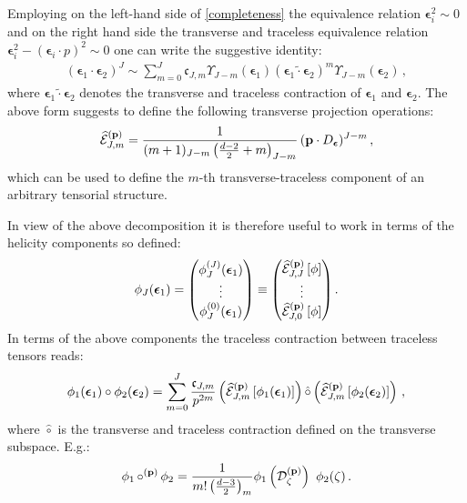 \documentclass[11pt,a4paper]{article}
\begin{document}
Employing on the left-hand side of \eqref{completeness} the equivalence relation $\boldsymbol{\epsilon}_i^2\sim 0$ and on the right hand side the transverse and traceless equivalence relation $\boldsymbol{\epsilon}_i^2-(\boldsymbol{\epsilon}_i\cdot p)^2\sim0$ one can write the suggestive identity:
\begin{align}
    (\boldsymbol{\epsilon}_1\cdot\boldsymbol{\epsilon}_2)^J\sim 
    \sum_{m=0}^J\mathfrak{c}_{J,m} {\Upsilon}_{J-m}(\boldsymbol{\epsilon}_1)(\widetilde{\boldsymbol{\epsilon}_1\cdot\boldsymbol{\epsilon}_2})^m{\Upsilon}_{J-m}(\boldsymbol{\epsilon}_2)\,,
\end{align}
where $\widetilde{\boldsymbol{\epsilon}_1\cdot\boldsymbol{\epsilon}_2}$ denotes the transverse and traceless contraction of $\boldsymbol{\epsilon}_1$ and $\boldsymbol{\epsilon}_2$. The above form suggests to define the following transverse projection operations:
\begin{align}\label{hp}
   \widehat{\mathcal{E}}^{({\bf p})}_{J,m}=\frac{1}{(m+1)_{J-m}\left(\tfrac{d-2}2+m\right)_{J-m}}\,(\bold{p}\cdot D_{\boldsymbol{\epsilon}})^{J-m}\,,
\end{align}
which can be used to define the $m$-th transverse-traceless component of an arbitrary tensorial structure. 

In view of the above decomposition it is therefore useful to work in terms of the helicity components so defined:
\begin{align}
    \phi_J(\boldsymbol{\epsilon}_1)=\begin{pmatrix}
    \phi_J^{(J)}(\boldsymbol{\epsilon}_1)\\
    \vdots\\
    \phi^{(0)}_{J}(\boldsymbol{\epsilon}_1)
    \end{pmatrix}\equiv\begin{pmatrix}
    \widehat{\mathcal{E}}_{J,J}^{({\bf p})}\left[\phi\right]\\
    \vdots\\
    \widehat{\mathcal{E}}_{J,0}^{({\bf p})}\left[\phi\right]
    \end{pmatrix}.
\end{align}
In terms of the above components the traceless contraction between traceless tensors reads:
\begin{align}
    \phi_1(\boldsymbol{\epsilon}_1)\circ\phi_2(\boldsymbol{\epsilon}_2)=\sum_{m=0}^{J}\frac{\mathfrak{c}_{J,m}}{p^{2m}}\left(\widehat{\mathcal{E}}_{J,m}^{({\bf p})}\left[\phi_1(\boldsymbol{\epsilon}_1)\right]\right)\hat{\circ}\left(\widehat{\mathcal{E}}_{J,m}^{({\bf p})}\left[\phi_2(\boldsymbol{\epsilon}_2)\right]\right)\,,
\end{align}
where $\hat{\circ}$ is the transverse and traceless contraction defined on the transverse subspace. E.g.:
\begin{align}
    \phi_1\,{\circ}^{(\bold{p})}\,\phi_2=\frac{1}{m!\left(\frac{d-3}2\right)_m}\phi_1\left(\mathcal{D}_{\zeta}^{({\bf p})}\right)\ \phi_2(\zeta)\,.
\end{align}
\end{document}
